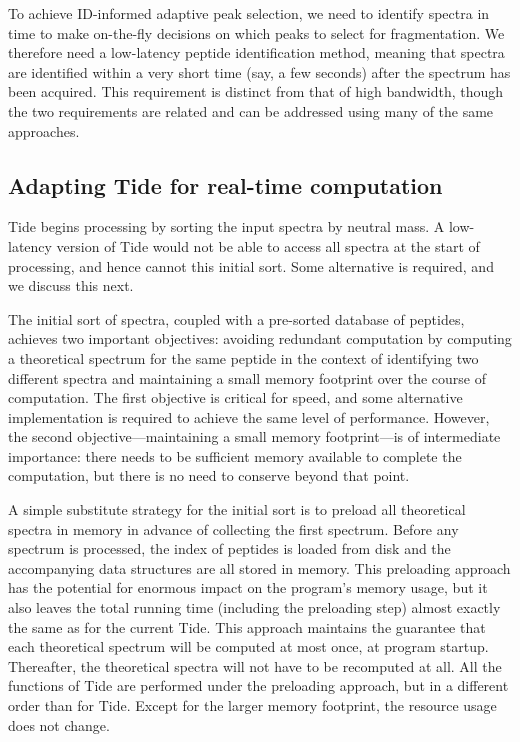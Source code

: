 \documentclass[12pt]{article}
\begin{document}
To achieve ID-informed adaptive peak selection, we need to identify
spectra in time to make on-the-fly decisions on which peaks to select
for fragmentation.  We therefore need a low-latency peptide
identification method, meaning that spectra are identified within a
very short time (say, a few seconds) after the spectrum has been
acquired. This requirement is distinct from that of high bandwidth,
though the two requirements are related and can be addressed using
many of the same approaches.

\subsection*{Adapting Tide for real-time computation}

Tide begins processing by sorting the input spectra by neutral mass. A
low-latency version of Tide would not be able to access all spectra at
the start of processing, and hence cannot this initial sort. Some
alternative is required, and we discuss this next.

The initial sort of spectra, coupled with a pre-sorted database of
peptides, achieves two important objectives: avoiding redundant
computation by computing a theoretical spectrum for the same peptide
in the context of identifying two different spectra and maintaining a
small memory footprint over the course of computation. The first
objective is critical for speed, and some alternative implementation
is required to achieve the same level of performance.  However, the
second objective---maintaining a small memory footprint---is of
intermediate importance: there needs to be sufficient memory available
to complete the computation, but there is no need to conserve beyond
that point.

A simple substitute strategy for the initial sort is to preload all
theoretical spectra in memory in advance of collecting the first
spectrum. Before any spectrum is processed, the index of peptides is
loaded from disk and the accompanying data structures are all stored
in memory. This preloading approach has the potential for enormous
impact on the program's memory usage, but it also leaves the total
running time (including the preloading step) almost exactly the same
as for the current Tide. This approach maintains the guarantee that
each theoretical spectrum will be computed at most once, at program
startup. Thereafter, the theoretical spectra will not have to be
recomputed at all. All the functions of Tide are performed under the
preloading approach, but in a different order than for Tide. Except
for the larger memory footprint, the resource usage does not change.
\end{document}
